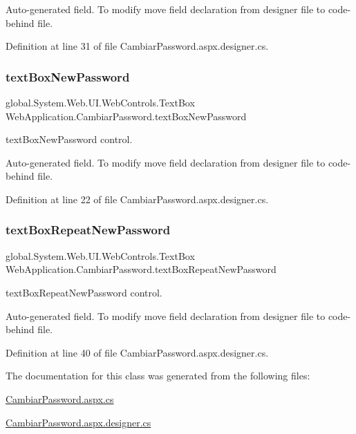 Auto-\/generated field. To modify move field declaration from designer file to code-\/behind file. 

Definition at line 31 of file Cambiar\+Password.\+aspx.\+designer.\+cs.

\mbox{\label{classWebApplication_1_1CambiarPassword_af57b154b17144a229bb1a89b02945d04}} 
\subsubsection{\texorpdfstring{textBoxNewPassword}{textBoxNewPassword}}
{\footnotesize\ttfamily global.\+System.\+Web.\+U\+I.\+Web\+Controls.\+Text\+Box Web\+Application.\+Cambiar\+Password.\+text\+Box\+New\+Password\hspace{0.3cm}{\ttfamily [protected]}}



text\+Box\+New\+Password control. 

Auto-\/generated field. To modify move field declaration from designer file to code-\/behind file. 

Definition at line 22 of file Cambiar\+Password.\+aspx.\+designer.\+cs.

\mbox{\label{classWebApplication_1_1CambiarPassword_a4db4322109a3840647ddabf2a508c42e}} 
\subsubsection{\texorpdfstring{textBoxRepeatNewPassword}{textBoxRepeatNewPassword}}
{\footnotesize\ttfamily global.\+System.\+Web.\+U\+I.\+Web\+Controls.\+Text\+Box Web\+Application.\+Cambiar\+Password.\+text\+Box\+Repeat\+New\+Password\hspace{0.3cm}{\ttfamily [protected]}}



text\+Box\+Repeat\+New\+Password control. 

Auto-\/generated field. To modify move field declaration from designer file to code-\/behind file. 

Definition at line 40 of file Cambiar\+Password.\+aspx.\+designer.\+cs.



The documentation for this class was generated from the following files\+:\begin{DoxyCompactItemize}
\item 
\mbox{\hyperlink{CambiarPassword_8aspx_8cs}{Cambiar\+Password.\+aspx.\+cs}}\item 
\mbox{\hyperlink{CambiarPassword_8aspx_8designer_8cs}{Cambiar\+Password.\+aspx.\+designer.\+cs}}\end{DoxyCompactItemize}
